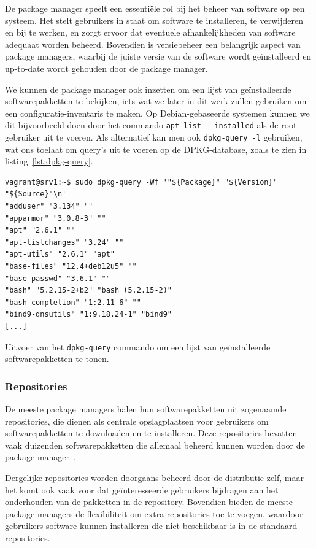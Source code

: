 De package manager speelt een essenti\"ele rol bij het beheer van software op een systeem.
Het stelt gebruikers in staat om software te installeren, te verwijderen en bij te werken, en zorgt ervoor dat eventuele afhankelijkheden van software adequaat worden beheerd.
Bovendien is versiebeheer een belangrijk aspect van package managers, waarbij de juiste versie van de software wordt ge\"installeerd en up-to-date wordt gehouden door de package manager.

We kunnen de package manager ook inzetten om een lijst van ge\"installeerde softwarepakketten te bekijken, iets wat we later in dit werk zullen gebruiken om een configuratie-inventaris te maken.
Op Debian-gebaseerde systemen kunnen we dit bijvoorbeeld doen door het commando \texttt{apt list -{}-installed} als de root-gebruiker uit te voeren.
Als alternatief kan men ook \texttt{dpkg-query -l} gebruiken, wat ons toelaat om query's uit te voeren op de DPKG-database, zoals te zien in listing~\ref{lst:dpkg-query}.

\begin{listing}
  \begin{verbatim}
vagrant@srv1:~$ sudo dpkg-query -Wf '"${Package}" "${Version}" "${Source}"\n'
"adduser" "3.134" ""
"apparmor" "3.0.8-3" ""
"apt" "2.6.1" ""
"apt-listchanges" "3.24" ""
"apt-utils" "2.6.1" "apt"
"base-files" "12.4+deb12u5" ""
"base-passwd" "3.6.1" ""
"bash" "5.2.15-2+b2" "bash (5.2.15-2)"
"bash-completion" "1:2.11-6" ""
"bind9-dnsutils" "1:9.18.24-1" "bind9"
[...]
  \end{verbatim}
    \caption[Lijst van ge\"{i}nstalleerde softwarepakketten.]{Uitvoer van het \texttt{dpkg-query} commando om een lijst van ge\"installeerde softwarepakketten te tonen.}
  \label{lst:dpkg-query}
\end{listing}

\subsubsection{Repositories}
\label{linux_repositories}

De meeste package managers halen hun softwarepakketten uit zogenaamde repositories, die dienen als centrale opslagplaatsen voor gebruikers om softwarepakketten te downloaden en te installeren.
Deze repositories bevatten vaak duizenden softwarepakketten die allemaal beheerd kunnen worden door de package manager~\autocite{shotts2019linux}.

Dergelijke repositories worden doorgaans beheerd door de distributie zelf, maar het komt ook vaak voor dat ge\"interesseerde gebruikers bijdragen aan het onderhouden van de pakketten in de repository.
Bovendien bieden de meeste package managers de flexibiliteit om extra repositories toe te voegen, waardoor gebruikers software kunnen installeren die niet beschikbaar is in de standaard repositories.


